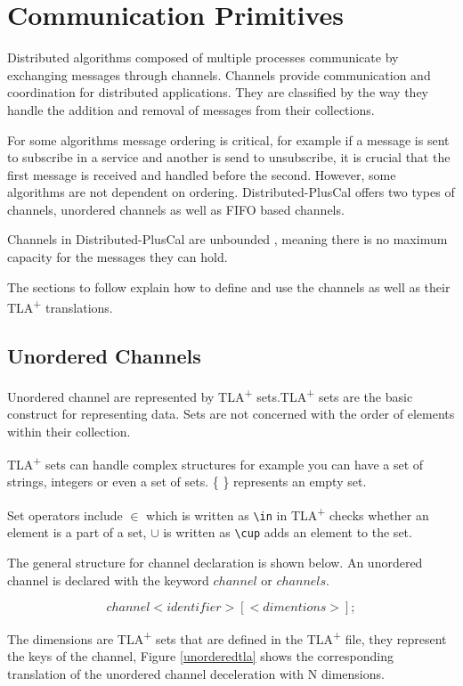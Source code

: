 \documentclass{thesul}
\newcommand{\tlaplus}{TLA\textsuperscript{+}\xspace}
\begin{document}
\FloatBarrier
\section{Communication Primitives}
\label{comChannels}

Distributed algorithms composed of multiple processes communicate by exchanging messages through channels. Channels provide communication and coordination for distributed applications. They are classified by the way they handle the addition and removal of messages from their collections. 

For some algorithms message ordering is critical, for example if a message is sent to subscribe in a service and another is send to unsubscribe, it is crucial that the first message is received and handled before the second. However, some algorithms are not dependent on ordering. Distributed-PlusCal offers two types of channels, unordered channels as well as FIFO based channels.

Channels in Distributed-PlusCal are unbounded , meaning there is no maximum capacity for the messages they can hold.

The sections to follow explain how to define and use the channels as well as their \tlaplus translations. 

\subsection{Unordered Channels}

Unordered channel are represented by \tlaplus sets.\tlaplus sets are the basic construct for representing data. Sets are not concerned with the order of elements within their collection.

\tlaplus sets can handle complex structures for example you can have a set of strings, integers or even a set of sets. \{ \} represents an empty set. 

Set operators include $\in$ which is written as \lstinline|\in| in \tlaplus checks whether an element is a part of a set, $\cup$ is written as \lstinline|\cup| adds an element to the set.

The general structure for channel declaration is shown below. An unordered channel is declared with the keyword $channel$ or $channels$. 

\[
 channel <identifier>[<dimentions>];
\]


The dimensions are \tlaplus sets that are defined in the \tlaplus file, they represent the keys of the channel, Figure \ref{unorderedtla} shows the corresponding translation of the unordered channel deceleration with N dimensions.
\end{document}
